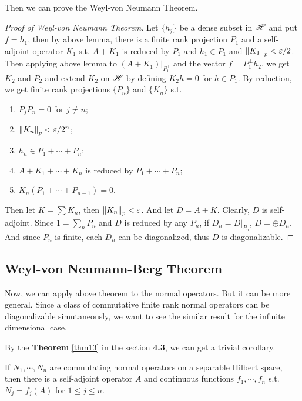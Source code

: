 Then we can prove the Weyl-von Neumann Theorem.

\begin{proof}[Proof of Weyl-von Neumann Theorem]
	Let $\{h_j\}$ be a dense subset in $\mathscr{H}$ and put $f = h_1$, then by above lemma, there is a finite rank projection $P_1$ and a self-adjoint operator $K_1$ s.t. $A+K_1$ is reduced by $P_1$ and $h_1 \in P_1$ and $\left\lVert K_1\right\lVert_p < \varepsilon / 2$. Then applying above lemma to $(A+K_1)|_{P_1^{\bot}}$ and the vector $f = P_1^{\bot} h_2$, we get $K_2$ and $P_2$ and extend $K_2$ on $\mathscr{H}$ by defining $K_2 h =0$ for $h \in P_1$. By reduction, we get finite rank projections $\{P_n\}$ and $\{K_n\}$ s.t.
	\begin{enumerate}[label = \arabic*)]
		\item $P_j P_n = 0$ for $j \neq n$;
		\item $\left\lVert K_n\right\lVert_p < \varepsilon / 2^n$;
		\item $h_n \in P_1 + \cdots + P_n$;
		\item $A+K_1+\cdots+K_n$ is reduced by $P_1 + \cdots + P_n$;
		\item $K_n(P_1 + \cdots + P_{n-1}) = 0$.
	\end{enumerate}
	Then let $K = \sum K_n$, then $\left\lVert K_n\right\lVert_p < \varepsilon$. And let $D = A + K$. Clearly, $D$ is self-adjoint. Since $1 = \sum_n P_n$ and $D$ is reduced by any $P_n$, if $D_n = D|_{P_n}$, $D = \oplus D_n$. And since $P_n$ is finite, each $D_n$ can be diagonalized, thus $D$ is diagonalizable.
\end{proof}

\subsection{Weyl-von Neumann-Berg Theorem}

Now, we can apply above theorem to the normal operators. But it can be more general. Since a class of commutative finite rank normal operators can be diagonalizable simutaneously, we want to see the similar result for the infinite dimensional case.

By the \textbf{Theorem} \ref{thm13} in the section \textbf{4.3}, we can get a trivial corollary.

\begin{cor}
	If $N_1, \cdots, N_n$ are commutating normal operators on a separable Hilbert space, then there is a self-adjoint operator $A$ and continuous functions $f_1,\cdots,f_n$ s.t. $N_j = f_j(A)$ for $1 \leqslant j \leqslant n$.
\end{cor}

